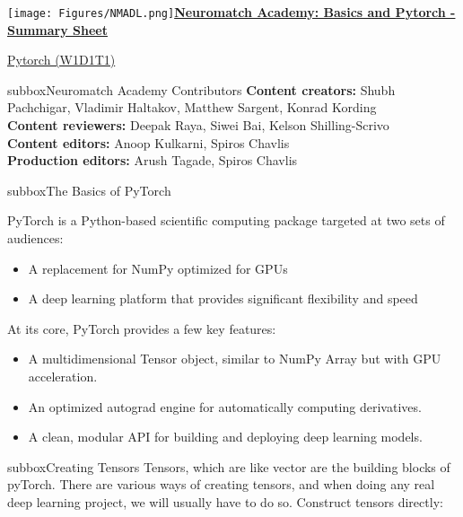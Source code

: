\texttt{[image: Figures/NMADL.png]}\href{https://compneuro.neuromatch.io/tutorials/intro.html}{\textbf{\Huge{Neuromatch Academy: Basics and Pytorch - Summary Sheet}}}
\small
\begin{multicols}{3}
\begin{textbox}{\href{https://deeplearning.neuromatch.io/tutorials/W1D1_BasicsAndPytorch/student/W1D1_Tutorial1.html}{Pytorch (W1D1T1) }}
\begin{subbox}{subbox}{Neuromatch Academy Contributors}
\scriptsize
\textbf{Content creators:} Shubh Pachchigar, Vladimir Haltakov, Matthew Sargent, Konrad Kording\\
\textbf{Content reviewers:} Deepak Raya, Siwei Bai, Kelson Shilling-Scrivo\\
\textbf{Content editors:} Anoop Kulkarni, Spiros Chavlis\\
\textbf{Production editors:} Arush Tagade, Spiros Chavlis

\end{subbox}
\begin{subbox}{subbox}{The Basics of PyTorch}
\scriptsize


PyTorch is a Python-based scientific computing package targeted at two sets of audiences:
\begin{itemize}
    \item 
A replacement for NumPy optimized for GPUs
    \item A deep learning platform that provides significant flexibility and speed
\end{itemize}
At its core, PyTorch provides a few key features:

\begin{itemize}
    \item A multidimensional Tensor object, similar to NumPy Array but with GPU acceleration.
    \item An optimized autograd engine for automatically computing derivatives.
    \item A clean, modular API for building and deploying deep learning models.
\end{itemize}



\end{subbox}
\begin{subbox}{subbox}{Creating Tensors}
\scriptsize
Tensors, which are like vector are the building blocks of pyTorch.
There are various ways of creating tensors, and when doing any real deep learning project, we will usually have to do so. Construct tensors directly:


\end{subbox}
\end{textbox}
\end{multicols}
